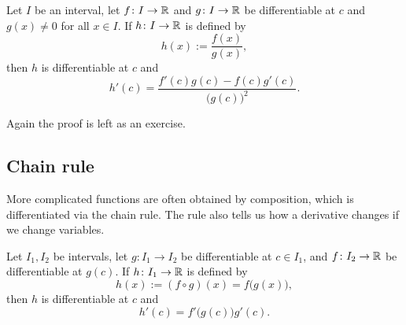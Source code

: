 \begin{prop}
Let $I$ be an interval, let
$f \colon I \to {\mathbb{R}}$ and $g \colon I \to {\mathbb{R}}$ be differentiable at $c$
and $g(x) \not= 0$ for all $x \in I$.
If $h \colon I \to {\mathbb{R}}$
is defined by
\begin{equation*}
h(x) := \frac{f(x)}{g(x)},
\end{equation*}
then $h$ is differentiable at $c$ and
\begin{equation*}
h'(c) = \frac{f'(c) g(c) - f(c) g'(c)}{{\bigl(g(c)\bigr)}^2} .
\end{equation*}
\end{prop}

Again the proof is left as an exercise.

\subsection{Chain rule}

More complicated functions are often obtained by composition,
which is differentiated via the chain rule.  The rule also tells us
how a derivative changes if we change variables.

\begin{prop}
Let $I_1, I_2$ be intervals, let
$g \colon I_1 \to I_2$ be differentiable at $c \in I_1$,
and
$f \colon I_2 \to {\mathbb{R}}$ be differentiable at $g(c)$.
If $h \colon I_1 \to {\mathbb{R}}$
is defined by
\begin{equation*}
h(x) := (f \circ g) (x) = f\bigl(g(x)\bigr) ,
\end{equation*}
then $h$ is differentiable at $c$ and
\begin{equation*}
h'(c) = f'\bigl(g(c)\bigr)g'(c) .
\end{equation*}
\end{prop}

